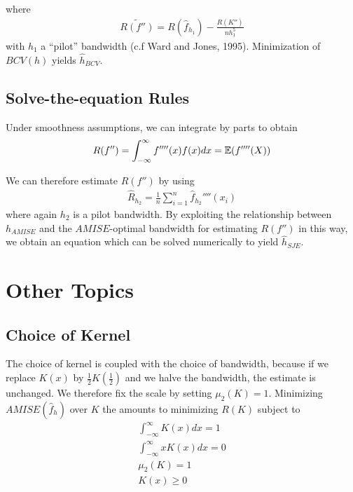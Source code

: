 where
\begin{align}
  \label{eq:35}
  \widetilde{R(f'')} = R(\hat f_{h_{1}}) - \frac{R(K'')}{nh_{1}^{5}}
\end{align} with $h_{1}$ a ``pilot'' bandwidth (c.f Ward and Jones,
1995).  Minimization of $BCV(h)$ yields $\hat h_{BCV}$.

\subsection{Solve-the-equation Rules}
\label{sec:solve-equation-rules}

Under smoothness assumptions, we can integrate by parts to obtain
\begin{align}
  \label{eq:37}
  R(f'') = \int_{-\infty}^{\infty} f''''(x) f(x) dx = \E{f''''(X)}
\end{align}

We can therefore estimate $R(f'')$ by using
\begin{align}
  \label{eq:38}
  \hat R_{h_{2}} = \frac{1}{n} \sum_{i=1}^{n} \hat
  f_{h_{2}}''''(x_{i})
\end{align} where again $h_{2}$ is a pilot bandwidth.  By exploiting
the relationship between $h_{AMISE}$ and the $AMISE$-optimal bandwidth
for estimating $R(f'')$ in this way, we obtain an equation which can
be solved numerically to yield $\hat h_{SJE}$.


\section{Other Topics}
\label{sec:other-topics}

\subsection{Choice of Kernel}
\label{sec:choice-kernel}

The choice of kernel is coupled with the choice of bandwidth, because
if we replace $K(x)$ by $\frac{1}{2} K(\frac{1}{2})$ and we halve the
bandwidth, the estimate is unchanged.  We therefore fix the scale by
setting $\mu_{2}(K) = 1$.  Minimizing $AMISE(\hat f_{h})$ over $K$ the
amounts to minimizing $R(K)$ subject to
\begin{align}
  \label{eq:40}
  \int_{-\infty}^{\infty} K(x) dx = 1 \\
  \int_{-\infty}^{\infty} x K(x) dx = 0 \\
  \mu_{2}(K) = 1 \\
  K(x) \geq 0
\end{align}

